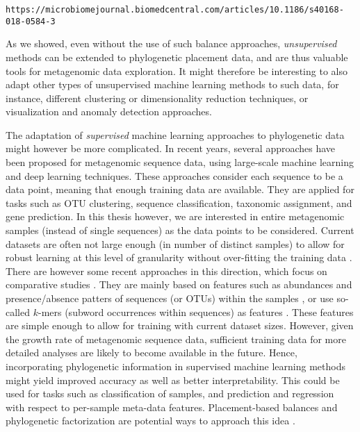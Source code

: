  \verb|https://microbiomejournal.biomedcentral.com/articles/10.1186/s40168-018-0584-3|

As we showed, even without the use of such balance approaches,
\emph{unsupervised} methods can be extended to phylogenetic placement data,
and are thus valuable tools for metagenomic data exploration.
It might therefore be interesting to also adapt other types of unsupervised machine learning methods to such data,
for instance, different clustering \cite{Kriegel2011} or dimensionality reduction \cite{VanDerMaaten2008} techniques,
or visualization \cite{Laczny2014} and anomaly detection approaches.

The adaptation of \emph{supervised} machine learning approaches to phylogenetic data might however be more complicated.
In recent years, several approaches have been proposed for metagenomic sequence data,
using large-scale machine learning \cite{Vervier2015,Soueidan2015}
and deep learning \cite{Angermueller2016,Fiannaca2018} techniques.
These approaches consider each sequence to be a data point, meaning that enough training data are available.
They are applied for tasks such as OTU clustering, sequence classification, taxonomic assignment, and gene prediction.
In this thesis however, we are interested in entire metagenomic samples (instead of single sequences)
as the data points to be considered.
Current datasets are often not large enough (in number of distinct samples)
to allow for robust learning at this level of granularity without over-fitting the training data \cite{Angermueller2016}.
There are however some recent approaches in this direction, which focus on comparative studies \cite{Soueidan2015}.
They are mainly based on features such as
abundances and presence/absence patters of sequences (or \acsp{OTU}) within the samples \cite{Pasolli2016},
or use so-called $k$-mers (subword occurrences within sequences) as features \cite{Asgari2015}.
These features are simple enough to allow for training with current dataset sizes.
However, given the growth rate of metagenomic sequence data,
sufficient training data for more detailed analyses are likely to become available in the future.
Hence, incorporating phylogenetic information in supervised machine learning methods might yield
improved accuracy as well as better interpretability.
This could be used for tasks such as classification of samples,
and prediction and regression with respect to per-sample meta-data features.
Placement-based balances and phylogenetic factorization
are potential ways to approach this idea \cite{Silverman2017,Washburne2017a}.

